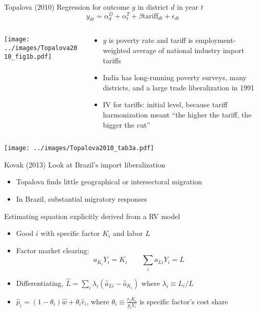 \documentclass[10pt,notes=hide]{beamer}
\begin{document}
\begin{frame}{Topalova (2010)}
Regression for outcome $y$ in district $d$ in year $t$
	\begin{equation*}
		y_{dt} = \alpha_d^D + \alpha_t^T + \beta \text{tariff}_{dt} + \epsilon_{dt}
	\end{equation*}
\begin{columns}
\begin{column}{.4\textwidth}
\texttt{[image: ../images/Topalova2010\_fig1b.pdf]}
\end{column}
\begin{column}{.58\textwidth}
\begin{itemize}
	\item $y$ is poverty rate and tariff is employment-weighted average of national industry import tariffs
	\item India has long-running poverty surveys, many districts, and a large trade liberalization in 1991
	\item IV for tariffs: initial level, because tariff harmonization meant ``the higher the tariff, the bigger the cut''
\end{itemize}
\end{column}
\end{columns}
\end{frame}
\begin{frame}{}
\begin{center}
\texttt{[image: ../images/Topalova2010\_tab3a.pdf]}
\end{center}
\end{frame}
\begin{frame}{Kovak (2013)}
Look at Brazil's import liberalization
\begin{itemize}
	\item Topalova finds little geographical or intersectoral migration
	\item In Brazil, substantial migratory responses
\end{itemize}
Estimating equation explicitly derived from a RV model
\begin{itemize}
	\item Good $i$ with specific factor $K_i$ and labor $L$
	\item Factor market clearing:
	\begin{equation*}
	a_{K_i} Y_i = K_i \qquad \sum_{i} a_{Li} Y_i = L
	\end{equation*}
	\item Differentiating, $\hat{L} = \sum_i \lambda_i (\hat{a}_{Li} - \hat{a}_{K_i})$ where $\lambda_i \equiv L_i / L$
	\item $\hat{p}_i = (1-\theta_i)\hat{w} + \theta_i \hat{r}_i$, where $\theta_i \equiv \frac{r_iK_i}{p_i Y_i}$ is specific factor's cost share
\end{itemize}
\end{frame}
\end{document}
